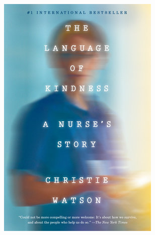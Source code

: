 \documentclass{tufte-handout}
\makeatletter
\newcommand{\varcaption}[2][0pt]{%
  \gsetlength{\@tufte@caption@vertical@offset}{-#1}%
  \gdef\@tufte@stored@varcaption{#2}%
}
\gdef\@tufte@stored@varcaption{} %
\makeatother
\begin{document}
\begin{itemize}
\begin{marginfigure}[-23\baselineskip]
   \includegraphics[width=\linewidth]{images/nurses_story.jpg}
   \varcaption{\href{https://www.penguinrandomhouse.com/books/557756/the-language-of-kindness-by-christie-watson/}{Publisher Link}, \href{https://www.amazon.com/Language-Kindness-Nurses-Story/dp/1524761648/}{Amazon Link}}
\end{marginfigure}

\end{itemize}
\end{document}
